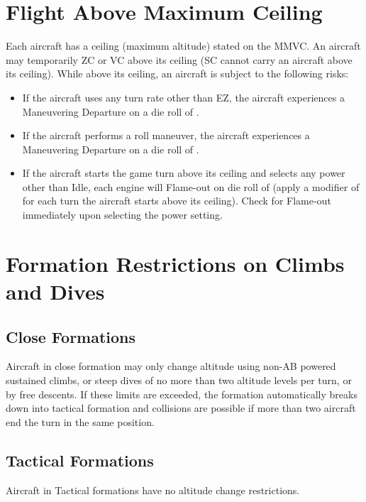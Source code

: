\begin{advancedrules}
\section{Flight Above Maximum Ceiling}
\label{rule:flight-above-maximum-ceiling}

Each aircraft has a ceiling (maximum altitude) stated on the MMVC. An aircraft may temporarily ZC or VC above its ceiling (SC cannot carry an aircraft above its ceiling). While above its ceiling, an aircraft is subject to the following risks:

\begin{itemize}

\item If the aircraft uses any turn rate other than EZ, the aircraft experiences a Maneuvering Departure on a die roll of .

\item If the aircraft performs a roll maneuver, the aircraft experiences a Maneuvering Departure on a die roll of .

\item If the aircraft starts the game turn above its ceiling and selects any power other than Idle, each engine will Flame-out on die roll of  (apply a modifier of  for each turn the aircraft starts above its ceiling). Check for Flame-out immediately upon selecting the power setting.

\end{itemize}

\section{Formation Restrictions on Climbs and Dives}

\subsection{Close Formations} Aircraft in close formation may only change altitude using non-AB powered sustained climbs, or steep dives of no more than two altitude levels per turn, or by free descents. If these limits are exceeded, the formation automatically breaks down into tactical formation and collisions are possible if more than two aircraft end the turn in the same position.

\subsection{Tactical Formations} Aircraft in Tactical formations have no altitude change restrictions.

\end{advancedrules}
